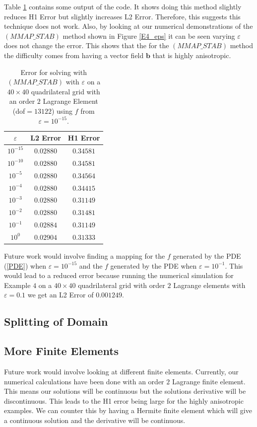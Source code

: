 \documentclass[12pt]{ociamthesis}
\begin{document}
Table \ref{Tbl_Map_f} contains some output of the code. It shows doing this method slightly reduces H1 Error but slightly increases L2 Error. Therefore, this suggests this technique does not work. Also, by looking at our numerical demonstrations of the $(MMAP\_STAB)$ method shown in Figure \ref{E4_eps} it can be seen varying $\varepsilon$ does not change the error. This shows that the for the $(MMAP\_STAB)$ method the difficulty comes from having a vector field $\mathbf{b}$ that is highly anisotropic. 
\begin{table}[H]
\begin{center}
\begin{tabular}{||ccc||}
\cline{2-3}
\multicolumn{1}{c|}{$\varepsilon$} & \multicolumn{1}{c|}{L2 Error} & \multicolumn{1}{c|}{H1 Error} \\
\hline 
\hline
$10^{-15}$  &  $0.02880$   &  $0.34581$\\
$10^{-10}$  &  $0.02880$   &  $0.34581$\\
$10^{-5}$  &  $0.02880$   &  $0.34564$\\
$10^{-4}$  &  $0.02880$   &  $0.34415$\\
$10^{-3}$  &  $0.02880$   &  $0.31149$\\
$10^{-2}$  &  $0.02880$   &  $0.31481$\\
$10^{-1}$  &  $0.02884$   &  $0.31149$\\
$10^{0}$  &  $0.02904$   &  $0.31333$\\
\hline
\end{tabular}
\end{center}
\caption{Error for solving with $(MMAP\_STAB)$ with $\varepsilon$ on a $40 \times 40$ quadrilateral grid with an order $2$ Lagrange Element (dof$=13122$) using $f$ from $\varepsilon=10^{-15}$.}
\label{Tbl_Map_f}
\end{table}
Future work would involve finding a mapping for the $f$ generated by the PDE (\ref{PDE}) when $\varepsilon=10^{-15}$ and the $f$ generated by the PDE when $\varepsilon=10^{-1}$. This would lead to a reduced error because running the numerical simulation for Example $4$ on a $40 \times 40$ quadrilateral grid with order $2$ Lagrange elements with $\varepsilon = 0.1$ we get an L2 Error of $0.001249$.

\subsection{Splitting of Domain}


\subsection{More Finite Elements}
Future work would involve looking at different finite elements. Currently, our numerical calculations have been done with an order $2$ Lagrange finite element. This means our solutions will be continuous but the solutions derivative will be discontinuous. This leads to the H1 error being large for the highly anisotropic examples. We can counter this by having a Hermite finite element which will give a continuous solution and the derivative will be continuous.
\end{document}
